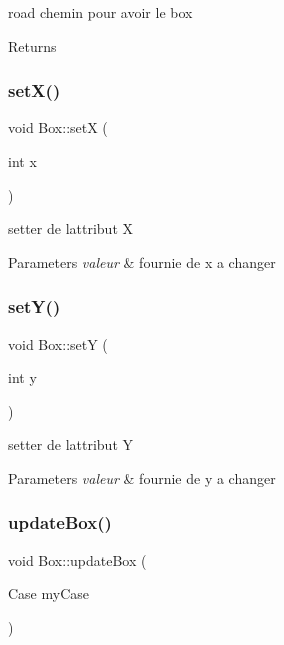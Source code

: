 road chemin pour avoir le box 

\begin{DoxyReturn}{Returns}

\end{DoxyReturn}
\mbox{\label{class_box_acd61860cf06c9bad6af1b14f30cd1897}} 
\subsubsection{\texorpdfstring{set\+X()}{setX()}}
{\footnotesize\ttfamily void Box\+::setX (\begin{DoxyParamCaption}\item[{int}]{x }\end{DoxyParamCaption})\hspace{0.3cm}{\ttfamily [inline]}}



setter de l\textquotesingle{}attribut X 


\begin{DoxyParams}{Parameters}
{\em valeur} & fournie de x a changer \\
\hline
\end{DoxyParams}
\mbox{\label{class_box_a35db410e0b63daf638f5d9b43d8aaa59}} 
\subsubsection{\texorpdfstring{set\+Y()}{setY()}}
{\footnotesize\ttfamily void Box\+::setY (\begin{DoxyParamCaption}\item[{int}]{y }\end{DoxyParamCaption})\hspace{0.3cm}{\ttfamily [inline]}}



setter de l\textquotesingle{}attribut Y 


\begin{DoxyParams}{Parameters}
{\em valeur} & fournie de y a changer \\
\hline
\end{DoxyParams}
\mbox{\label{class_box_aec16e613cc17e290448fa203c8968052}} 
\subsubsection{\texorpdfstring{update\+Box()}{updateBox()}}
{\footnotesize\ttfamily void Box\+::update\+Box (\begin{DoxyParamCaption}\item[{Case}]{my\+Case }\end{DoxyParamCaption})}



